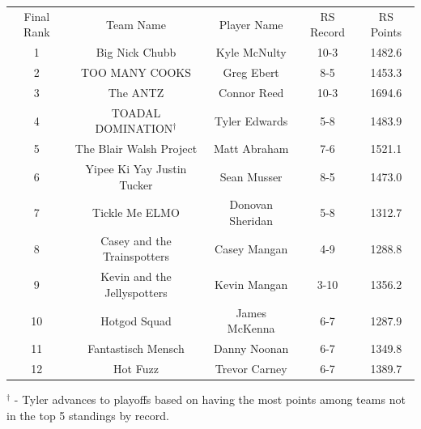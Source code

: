 \documentclass[11pt,letterpaper]{article}
\begin{document}
\vspace{-25pt}
\begin{table} [h]
\begin{center}
\begin{tabular} { c c c c c }
\\ Final Rank & Team Name & Player Name & RS Record & RS Points
\\ 1 & Big Nick Chubb & Kyle McNulty & 10-3 & 1482.6
\\ 2 & TOO MANY COOKS & Greg Ebert & 8-5 & 1453.3
\\ 3 & The ANTZ & Connor Reed & 10-3 & 1694.6
\\ 4 & TOADAL DOMINATION$^\dag$ & Tyler Edwards & 5-8 & 1483.9
\\ 5 & The Blair Walsh Project & Matt Abraham & 7-6 & 1521.1
\\ 6 & Yipee Ki Yay Justin Tucker & Sean Musser & 8-5 & 1473.0
\\ 7 & Tickle Me ELMO & Donovan Sheridan & 5-8 & 1312.7
\\ 8 & Casey and the Trainspotters & Casey Mangan & 4-9 & 1288.8
\\ 9 & Kevin and the Jellyspotters & Kevin Mangan & 3-10 & 1356.2
\\ 10 & Hotgod Squad & James McKenna & 6-7 & 1287.9
\\ 11 & Fantastisch Mensch & Danny Noonan & 6-7 & 1349.8
\\ 12 & Hot Fuzz & Trevor Carney & 6-7 & 1389.7
\end{tabular}
\end{center}
\noindent$^\dag$ - Tyler advances to playoffs based on having the most points among teams not in the top 5 standings by record.
\end{table}
\end{document}
